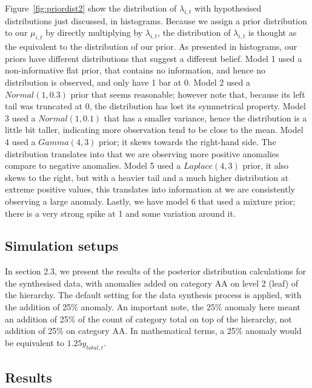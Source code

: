 Figure~\ref{fig:priordist2} show the distribution of $\lambda_{i,t}$ with hypothesised distributions just discussed, in histograms. Because we assign a prior distribution to our $\mu_{i,t}$ by directly multiplying by $\lambda_{i,t}$, the distribution of $\lambda_{i,t}$ is thought as the equivalent to the distribution of our prior. As presented in histograms, our priors have different distributions that suggest a different belief. Model 1 used a non-informative flat prior, that contains no information, and hence no distribution is observed, and only have 1 bar at 0. Model 2 used a $Normal(1, 0.3)$ prior that seems reasonable; however note that, because its left tail was truncated at 0, the distribution has lost its symmetrical property. Model 3 used a $Normal(1, 0.1)$ that has a smaller variance, hence the distribution is a little bit taller, indicating more observation tend to be close to the mean. Model 4 used a $Gamma(4, 3)$ prior; it skews towards the right-hand side. The distribution translates into that we are observing more positive anomalies compare to negative anomalies. Model 5 used a $Laplace(4, 3)$ prior, it also skews to the right, but with a heavier tail and a much higher distribution at extreme positive values, this translates into information at we are consistently observing a large anomaly. Lastly, we have model 6 that used a mixture prior; there is a very strong spike at 1 and some variation around it.

\subsection{Simulation setups }

In section 2.3, we present the results of the posterior distribution calculations for the synthesised data, with anomalies added on category AA on level 2 (leaf) of the hierarchy. The default setting for the data synthesis process is applied, with the addition of 25\% anomaly. An important note, the 25\% anomaly here meant an addition of 25\% of the count of category total on top of the hierarchy, not addition of 25\% on category AA. In mathematical terms, a 25\% anomaly would be equivalent to $1.25 y_{total,t}$. 

\subsection{Results}

